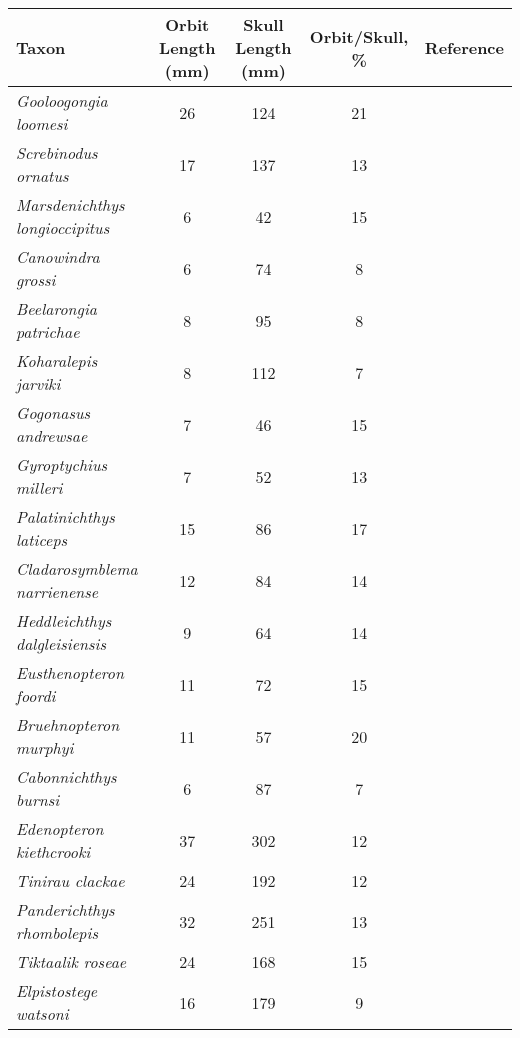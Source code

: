 \begin{tabular}{|L{4.5cm}|c|c|c|L{4.5cm}|}
\hline
\textbf{Taxon}&\textbf{Orbit Length (mm)}&\textbf{Skull Length (mm)}&\textbf{Orbit/Skull, \%}&\textbf{Reference}\\\hline
\textit{Gooloogongia loomesi}&26&124&21&\citet{Joha98a}\\\hline
\textit{Screbinodus ornatus}&17&137&13&\citet{Jeff12a}\\\hline
\textit{Marsdenichthys longioccipitus}&6&42&15&\citet{Holl10a}\\\hline
\textit{Canowindra grossi}&6&74&8&\citet{Long85a}\\\hline
\textit{Beelarongia patrichae}&8&95&8&\citet{Long87a}\\\hline
\textit{Koharalepis jarviki}&8&112&7&\citet{Youn92a}\\\hline
\textit{Gogonasus andrewsae}&7&46&15&\citet{Long06a}\\\hline
\textit{Gyroptychius  milleri}&7&52&13&\citet{Newm15a}\\\hline
\textit{Palatinichthys laticeps}&15&86&17&\citet{Witz12a}\\\hline
\textit{Cladarosymblema narrienense}&12&84&14&\citet{Fox95a}\\\hline
\textit{Heddleichthys dalgleisiensis}&9&64&14&\citet{Snit09a}\\\hline
\textit{Eusthenopteron foordi}&11&72&15&\citet{Mark07a}\\\hline
\textit{Bruehnopteron  murphyi}&11&57&20&\citet{Schu12a}\\\hline
\textit{Cabonnichthys burnsi}&6&87&7&\citet{Ahlb97a}\\\hline
\textit{Edenopteron kiethcrooki}&37&302&12&\citet{Youn13a}\\\hline
\textit{Tinirau clackae}&24&192&12&\citet{Swar12a}\\\hline
\textit{Panderichthys rhombolepis}&32&251&13&\citet{Voro91a}\\\hline
\textit{Tiktaalik roseae}&24&168&15&\citet{Daes06a}\\\hline
\textit{Elpistostege watsoni}&16&179&9&\citet{Schu85a}\\\hline
\end{tabular}
